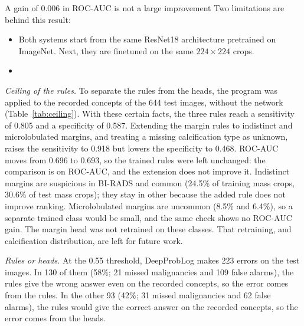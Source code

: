 A gain of $0.006$ in ROC-AUC is not a large improvement Two limitations are behind this result:
\begin{itemize}
\item Both systems start from the same ResNet18  architecture pretrained on ImageNet. Next, they are  finetuned on the same $224\times224$ crops.

\item {}

\end{itemize}

\begin{revblock}
\textit{Ceiling of the rules.} To separate the rules from the heads, the program was applied to the recorded concepts of the 644 test images, without the network (Table~\ref{tab:ceiling}). With these certain facts, the three rules reach a sensitivity of 0.805 and a specificity of 0.587. Extending the margin rules to indistinct and microlobulated margins, and treating a missing calcification type as unknown, raises the sensitivity to 0.918 but lowers the specificity to 0.468. ROC-AUC moves from 0.696 to 0.693, so the trained rules were left unchanged: the comparison is on ROC-AUC, and the extension does not improve it. Indistinct margins are suspicious in BI-RADS and common (24.5\% of training mass crops, 30.6\% of test mass crops); they stay in other because the added rule does not improve ranking. Microlobulated margins are uncommon (8.5\% and 6.4\%), so a separate trained class would be small, and the same check shows no ROC-AUC gain. The margin head was not retrained on these classes. That retraining, and calcification distribution, are left for future work.

\textit{Rules or heads.} At the 0.55 threshold, DeepProbLog makes 223 errors on the test images. In 130 of them (58\%; 21 missed malignancies and 109 false alarms), the rules give the wrong answer even on the recorded concepts, so the error comes from the rules. In the other 93 (42\%; 31 missed malignancies and 62 false alarms), the rules would give the correct answer on the recorded concepts, so the error comes from the heads.

\end{revblock}

